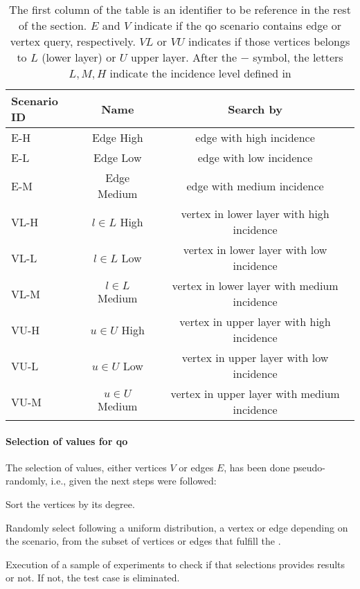 \begin{table}[htp!]
  \centering
  \begin{tabular}{|l|c|c|}
    \hline
    \textbf{Scenario ID} & \textbf{Name} & \textbf{Search by}\\
    \hline
    E-H & Edge High & edge with high incidence \\
    \hline
    E-L & Edge Low & edge with low incidence \\
    \hline
    E-M & Edge Medium & edge with medium incidence \\
    \hline
    VL-H & $l \in L$ High & vertex in lower layer with high incidence \\
    \hline
    VL-L & $l \in L$ Low & vertex in lower layer with low incidence \\
    \hline
    VL-M & $l \in L$ Medium & vertex in lower layer with medium incidence \\
    \hline
    VU-H & $u \in U$ High & vertex in upper layer with high incidence \\
    \hline
    VU-L & $u \in U$ Low & vertex in upper layer with low incidence \\
    \hline
    VU-M & $u \in U$ Medium & vertex in upper layer with medium incidence \\
    \hline
  \end{tabular}
  \caption[{[EE] Experiment Data Setup for experiments}]{The first column of the table is an identifier to be reference in the rest of the section. $E$ and $V$ indicate if the \acrshort{qo} scenario contains edge or vertex query, respectively. $VL$ or $VU$ indicates if those vertices belongs to $L$ (lower layer) or $U$ upper layer. After the $-$ symbol, the letters $L,M,H$ indicate the incidence level defined in }
  \label{table:exp:data-setup}
  \end{table}

\paragraph{Selection of values for \acrshort{qo}}\label{sub:exp:sel-vals} The selection of values, either vertices $V$ or edges $E$, has been done pseudo-randomly, i.e., given  the next steps were followed: \begin{inparaenum}[\bf i\upshape)]
  \item Sort the vertices by its degree.
  \item Randomly select following a uniform distribution,  a vertex or edge depending on the scenario, from the subset of vertices or edges that fulfill the .
  \item Execution of a sample of experiments to check if that selections provides results or not. If not, the test case is eliminated.
\end{inparaenum}
  

